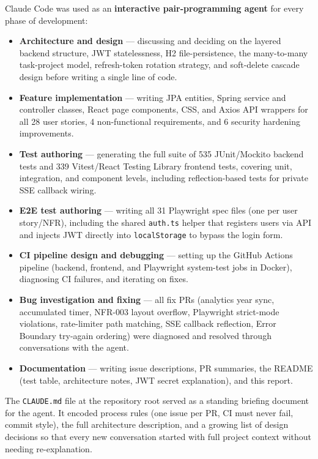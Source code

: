 \documentclass[a4paper, 12pt]{article}
\begin{document}
Claude Code was used as an \textbf{interactive pair-programming agent} for every phase of
development:

\begin{itemize}
  \item \textbf{Architecture and design} --- discussing and deciding on the layered backend
        structure, JWT statelessness, H2 file-persistence, the many-to-many task-project
        model, refresh-token rotation strategy, and soft-delete cascade design before writing
        a single line of code.
  \item \textbf{Feature implementation} --- writing JPA entities, Spring service and
        controller classes, React page components, CSS, and Axios API wrappers for all 28
        user stories, 4 non-functional requirements, and 6 security hardening improvements.
  \item \textbf{Test authoring} --- generating the full suite of 535 JUnit/Mockito backend
        tests and 339 Vitest/React Testing Library frontend tests, covering unit, integration,
        and component levels, including reflection-based tests for private SSE callback
        wiring.
  \item \textbf{E2E test authoring} --- writing all 31 Playwright spec files (one per user
        story/NFR), including the shared \texttt{auth.ts} helper that registers users via API
        and injects JWT directly into \texttt{localStorage} to bypass the login form.
  \item \textbf{CI pipeline design and debugging} --- setting up the GitHub Actions pipeline
        (backend, frontend, and Playwright system-test jobs in Docker), diagnosing CI
        failures, and iterating on fixes.
  \item \textbf{Bug investigation and fixing} --- all fix PRs (analytics year sync,
        accumulated timer, NFR-003 layout overflow, Playwright strict-mode violations,
        rate-limiter path matching, SSE callback reflection, Error Boundary try-again
        ordering) were diagnosed and resolved through conversations with the agent.
  \item \textbf{Documentation} --- writing issue descriptions, PR summaries, the README
        (test table, architecture notes, JWT secret explanation), and this report.
\end{itemize}

The \texttt{CLAUDE.md} file at the repository root served as a standing briefing document
for the agent. It encoded process rules (one issue per PR, CI must never fail, commit style),
the full architecture description, and a growing list of design decisions so that every new
conversation started with full project context without needing re-explanation.
\end{document}
